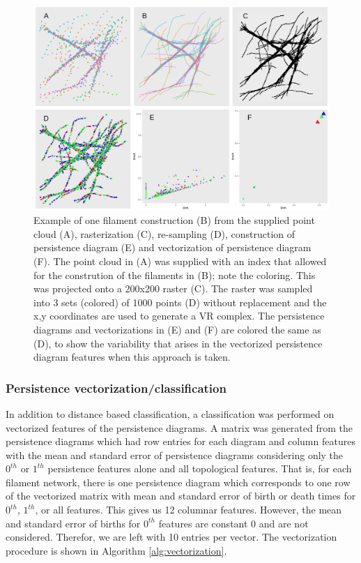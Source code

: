 \documentclass[10pt]{article}
\begin{document}
\begin{figure}[tbp]
	\begin{center}
		\includegraphics[width=1\textwidth]{resample_algo.PNG}
	\end{center}
	\caption{Example of one filament construction (B) from the supplied point cloud (A), rasterization (C), re-sampling (D), construction of persistence diagram (E) and vectorization of persistence diagram (F). The point cloud in (A) was supplied with an index that allowed for the constrution of the filaments in (B); note the coloring. This was projected onto a 200x200 raster (C). The raster was sampled into 3 sets (colored) of 1000 points (D) without replacement and the x,y coordinates are used to generate a VR complex. The persistence diagrams and vectorizations in (E) and (F) are colored the same as (D), to show the variability that arises in the vectorized persistence diagram features when this approach is taken.}
	\label{fig:resample_algorithm}
\end{figure}


\subsubsection{Persistence vectorization/classification}

In addition to distance based classification, a classification was performed on vectorized features of the persistence diagrams. A matrix was generated from the persistence diagrams which had row entries for each diagram and column features with the mean and standard error of persistence diagrams considering only the $0^{th}$ or $1^{th}$ persistence features alone and all topological features. That is, for each filament network, there is one persistence diagram which corresponds to one row of the vectorized matrix with mean and standard error of birth or death times for $0^{th}$, $1^{th}$, or all features. This gives us 12 columnar features. However, the mean and standard error of births for $0^{th}$ features are constant 0 and are not considered. Therefor, we are left with 10 entries per vector. The vectorization procedure is shown in Algorithm \ref{alg:vectorization}. 
\end{document}
